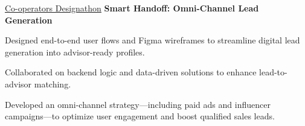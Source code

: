 \begin{twocolentry}{\hspace{.5pt} \href{https://www.cooperators.ca/}{Co-operators Designathon}}
\textbf{Smart Handoff: Omni-Channel Lead Generation}
\end{twocolentry}
\begin{onecolentry}
\begin{highlights}
\item Designed end-to-end user flows and Figma wireframes to streamline digital lead generation into advisor-ready profiles.
\item Collaborated on backend logic and data-driven solutions to enhance lead-to-advisor matching.
\item Developed an omni-channel strategy—including paid ads and influencer campaigns—to optimize user engagement and boost qualified sales leads.
\end{highlights}
\end{onecolentry}
